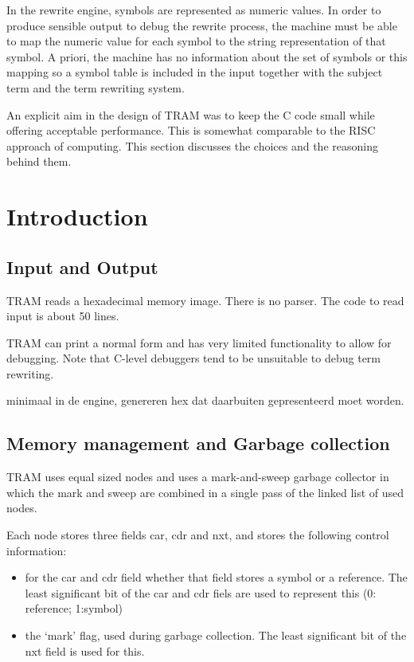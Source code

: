 \documentclass[11pt,twoside]{memoir}
\begin{document}
In the rewrite engine, symbols are represented as numeric values. In order to produce sensible output to debug the rewrite process, the machine must be able to map the numeric value for each symbol to the string representation of that symbol. A priori, the machine has no information about the set of symbols or this mapping so a symbol table is included in the input together with the subject term and the term rewriting system.

An explicit aim in the design of TRAM was to keep the C code small while offering acceptable performance. This is somewhat comparable to the RISC approach of computing. This section discusses the choices and the reasoning behind them.

\section{Introduction}
\label{sect:i}

\subsection{Input and Output}
\label{sect:iao}

TRAM reads a hexadecimal memory image. There is no parser. The code to read input is about 50 lines.

TRAM can print a normal form and has very limited functionality to allow for debugging. Note that C-level debuggers tend to be unsuitable to debug term rewriting. 

 minimaal in de engine, genereren hex dat daarbuiten gepresenteerd moet worden.

\subsection{Memory management and Garbage collection}
\label{sect:mmagc}

TRAM uses equal sized nodes and uses a mark-and-sweep garbage collector in which the mark and sweep are combined in a single pass of the linked list of used nodes.

Each node stores three fields car, cdr and nxt, and stores the following control information:

\begin{itemize}
	\item for the car and cdr field whether that field stores a symbol or a reference. The least significant bit of the car and cdr fiels are used to represent this (0: reference; 1:symbol)
	\item the `mark' flag, used during garbage collection. The least significant bit of the nxt field is used for this.
\end{itemize}
\end{document}
